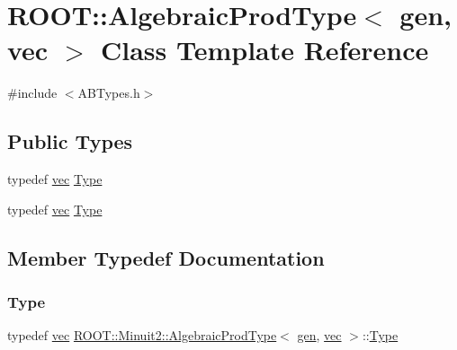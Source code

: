 \hypertarget{classROOT_1_1Minuit2_1_1AlgebraicProdType_3_01gen_00_01vec_01_4}{}\section{R\+O\+OT\+:\+:Algebraic\+Prod\+Type$<$ gen, vec $>$ Class Template Reference}
\label{classROOT_1_1Minuit2_1_1AlgebraicProdType_3_01gen_00_01vec_01_4}


{\ttfamily \#include $<$A\+B\+Types.\+h$>$}

\subsection*{Public Types}
\begin{DoxyCompactItemize}
\item 
typedef \mbox{\hyperlink{classROOT_1_1Minuit2_1_1vec}{vec}} \mbox{\hyperlink{classROOT_1_1Minuit2_1_1AlgebraicProdType_3_01gen_00_01vec_01_4_aea7f5057aa02e4473fef4887b06d4f71}{Type}}
\item 
typedef \mbox{\hyperlink{classROOT_1_1Minuit2_1_1vec}{vec}} \mbox{\hyperlink{classROOT_1_1Minuit2_1_1AlgebraicProdType_3_01gen_00_01vec_01_4_aea7f5057aa02e4473fef4887b06d4f71}{Type}}
\end{DoxyCompactItemize}


\subsection{Member Typedef Documentation}
\mbox{\label{classROOT_1_1Minuit2_1_1AlgebraicProdType_3_01gen_00_01vec_01_4_aea7f5057aa02e4473fef4887b06d4f71}} 
\subsubsection{\texorpdfstring{Type}{Type}\hspace{0.1cm}{\footnotesize\ttfamily [1/2]}}
{\footnotesize\ttfamily typedef \mbox{\hyperlink{classROOT_1_1Minuit2_1_1vec}{vec}} \mbox{\hyperlink{classROOT_1_1Minuit2_1_1AlgebraicProdType}{R\+O\+O\+T\+::\+Minuit2\+::\+Algebraic\+Prod\+Type}}$<$ \mbox{\hyperlink{classROOT_1_1Minuit2_1_1gen}{gen}}, \mbox{\hyperlink{classROOT_1_1Minuit2_1_1vec}{vec}} $>$\+::\mbox{\hyperlink{classROOT_1_1Minuit2_1_1AlgebraicProdType_3_01gen_00_01vec_01_4_aea7f5057aa02e4473fef4887b06d4f71}{Type}}}

